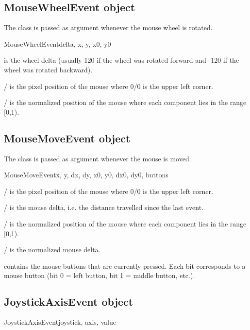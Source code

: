 \subsection{MouseWheelEvent object}

The  class is passed as argument whenever
the mouse wheel is rotated.

\begin{classdesc}{MouseWheelEvent}{delta, x, y, x0, y0}

 is the wheel delta (usually 120 if the wheel was rotated
forward and -120 if the wheel was rotated backward).

/ is the pixel position of the mouse where 0/0 is the upper
left corner.

/ is the normalized position of the mouse where each 
component lies in the range [0,1).

\end{classdesc}

\subsection{MouseMoveEvent object}

The  class is passed as argument whenever the
mouse is moved.

\begin{classdesc}{MouseMoveEvent}{x, y, dx, dy, x0, y0, dx0, dy0, buttons}

/ is the pixel position of the mouse where 0/0 is the upper
left corner.

/ is the mouse delta, i.e. the distance travelled since
the last event.

/ is the normalized position of the mouse where each 
component lies in the range [0,1).

/ is the normalized mouse delta.

 contains the mouse buttons that are currently pressed.
Each bit corresponds to a mouse button (bit 0 = left button, bit 1 = middle
button, etc.).
\end{classdesc}

\subsection{JoystickAxisEvent object}

\begin{classdesc}{JoystickAxisEvent}{joystick, axis, value}
\end{classdesc}


